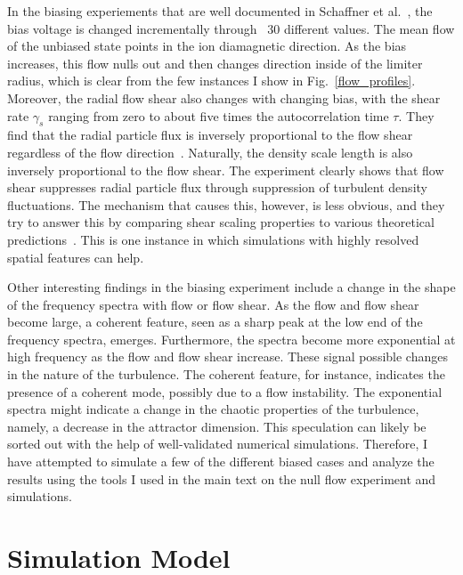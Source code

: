 In the biasing experiements that are well documented in Schaffner et al.~\cite{schaffner2012,schaffner2013}, the bias voltage is changed incrementally through ~30 different values. 
The mean flow of the unbiased state points in the ion diamagnetic direction. As the bias increases, this flow nulls out and then changes direction inside of the limiter radius, which is
clear from the few instances I show in Fig.~\ref{flow_profiles}. Moreover, the radial flow shear also changes with changing bias, with the shear rate $\gamma_s$ ranging from zero to about five times
the autocorrelation time $\tau$. They find that the radial particle flux is inversely proportional to the flow shear regardless of the flow direction~\cite{schaffner2012}. 
Naturally, the density scale length is also inversely proportional to the flow shear. The experiment clearly shows that flow shear suppresses radial particle flux through suppression of turbulent
density fluctuations. 
The mechanism that causes this, however, is less obvious, and they try to answer this by comparing shear scaling properties to various theoretical predictions~\cite{schaffner2013}.
This is one instance in which simulations with highly resolved spatial features can help.

Other interesting findings in the biasing experiment include a change in the shape of the frequency spectra with flow or flow shear. As the flow and flow shear become large, a coherent feature,
seen as a sharp peak at the low end of the frequency spectra, emerges. Furthermore, the spectra become more exponential at high frequency as the flow and flow shear increase. These signal
possible changes in the nature of the turbulence. The coherent feature, for instance, indicates the presence of a coherent mode, possibly due to a flow instability. The exponential spectra
might indicate a change in the chaotic properties of the turbulence, namely, a decrease in the attractor dimension. This speculation can likely be sorted out with
the help of well-validated numerical simulations. Therefore, I have attempted to simulate a few of the different biased cases and analyze the results using the tools I used in the main
text on the null flow experiment and simulations.


\section{Simulation Model}
\label{s_sim_model}

